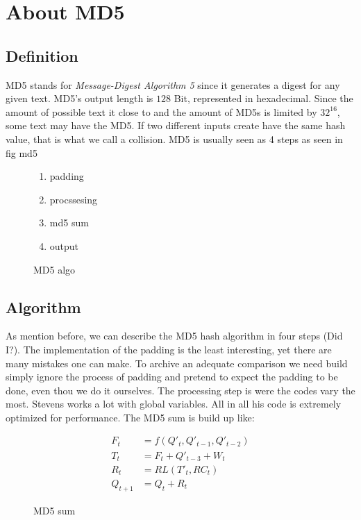 \chapter{About MD5}
\label{chapter:kap2}
\section{Definition}
MD5 stands for \textit{Message-Digest Algorithm 5} since it generates a digest for any given text. MD5's output length is $128$ Bit, represented in hexadecimal. Since the amount of possible text it close to
and the amount of MD5s is limited by $32^{16}$, some text may have the MD5. If two different inputs create have the same hash value, that is what we call a collision.
MD5 is usually seen as 4 steps as seen in fig {md5}\\
\begin{figure}
    \begin{enumerate}
        \item padding
        \item procssesing
        \item md5 sum 
        \item output
    \end{enumerate}
\caption{MD5 algo}
\label{md5}
\end{figure}

\section{Algorithm}

As mention before, we can describe the MD5 hash algorithm in four steps (Did I?).
The implementation of the padding is the least interesting, yet there are many mistakes one can make.
To archive an adequate comparison we need build simply ignore the process of padding and pretend to expect the padding to be done, even thou we do it ourselves.
The processing step is were the codes vary the most. Stevens works a lot with global variables. All in all his code is extremely optimized for performance.
The MD5 sum is build up like:\\
\begin{figure}
    \begin{align*}
        F_t &= f \left( Q'_t,Q'_{t-1},Q'_{t-2} \right) \\
        T_t &=  F_t + Q'_{t-3} +  W_t \\
        R_t &=  RL \left(T'_t,RC_t \right) \\
        Q_{t+1} &=  Q_t +  R_t
    \end{align*}
    \caption[short]{MD5 sum}
\label{md5sum}
\end{figure}
